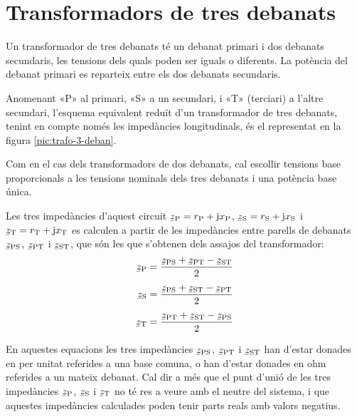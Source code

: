 \section{Transformadors de tres debanats}\label{sec:trafo-3-deban}

Un transformador de tres debanats té un debanat primari i dos debanats secundaris, les tensions dels quals poden ser iguals o diferents. La potència del debanat primari es reparteix entre els dos debanats secundaris.

Anomenant «P» al primari, «S» a un secundari, i «T» (terciari) a l'altre secundari, l'esquema equivalent reduït d'un transformador de tres debanats, tenint en compte només les impedàncies longitudinals,  és el representat en la figura \vref{pic:trafo-3-deban}.

\begin{center}
    
    \label{pic:trafo-3-deban}
\end{center}

Com en el cas dels transformadors de dos debanats, cal escollir tensions base proporcionals a les tensions nominals dels tres debanats i una potència base única.

Les tres impedàncies d'aquest circuit $\cmplx{z}\ped{P} = r\ped{P} + \ju x\ped{P}$, $\cmplx{z}\ped{S} = r\ped{S} + \ju x\ped{S}$ i $\cmplx{z}\ped{T} = r\ped{T} + \ju x\ped{T}$ es calculen a partir de les impedàncies entre parells de debanats $\cmplx{z}\ped{PS}$, $\cmplx{z}\ped{PT}$ i $\cmplx{z}\ped{ST}$, que són les que s'obtenen dels assajos del transformador:
\begin{subequations}
\begin{align}
    \cmplx{z}\ped{P} &= \frac{\cmplx{z}\ped{PS}+\cmplx{z}\ped{PT}-\cmplx{z}\ped{ST}}{2}  \\[1ex]
    \cmplx{z}\ped{S} &= \frac{\cmplx{z}\ped{PS}+\cmplx{z}\ped{ST}-\cmplx{z}\ped{PT}}{2}  \\[1ex]
    \cmplx{z}\ped{T} &= \frac{\cmplx{z}\ped{PT}+\cmplx{z}\ped{ST}-\cmplx{z}\ped{PS}}{2}
\end{align}
\end{subequations}

En aquestes equacions  les tres impedàncies $\cmplx{z}\ped{PS}$, $\cmplx{z}\ped{PT}$ i $\cmplx{z}\ped{ST}$ han d'estar donades en per unitat referides a una base comuna, o han d'estar donades en ohm referides a un mateix debanat. Cal dir a més que el punt d'unió de les tres impedàncies $\cmplx{z}\ped{P}$, $\cmplx{z}\ped{S}$ i $\cmplx{z}\ped{T}$ no té res a veure amb el neutre del sistema, i que aquestes impedàncies calculades poden tenir parts reals amb valors  negatius.


